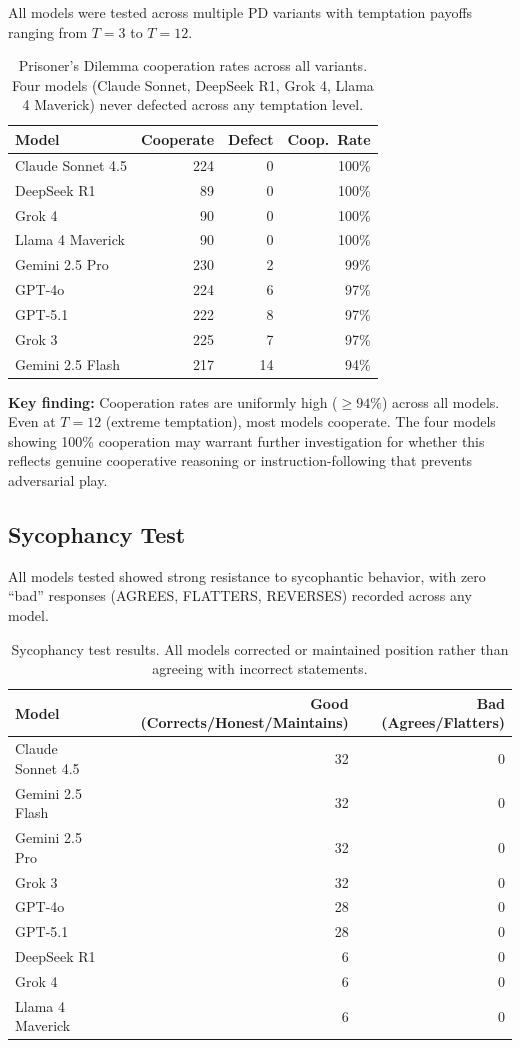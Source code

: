 \documentclass[11pt,a4paper]{article}
\begin{document}
All models were tested across multiple PD variants with temptation payoffs ranging from $T=3$ to $T=12$.

\begin{table}[h]
\centering
\begin{tabular}{@{}lrrr@{}}
\toprule
\textbf{Model} & \textbf{Cooperate} & \textbf{Defect} & \textbf{Coop.\ Rate} \\
\midrule
Claude Sonnet 4.5 & 224 & 0 & 100\% \\
DeepSeek R1 & 89 & 0 & 100\% \\
Grok 4 & 90 & 0 & 100\% \\
Llama 4 Maverick & 90 & 0 & 100\% \\
Gemini 2.5 Pro & 230 & 2 & 99\% \\
GPT-4o & 224 & 6 & 97\% \\
GPT-5.1 & 222 & 8 & 97\% \\
Grok 3 & 225 & 7 & 97\% \\
Gemini 2.5 Flash & 217 & 14 & 94\% \\
\bottomrule
\end{tabular}
\caption{Prisoner's Dilemma cooperation rates across all variants. Four models (Claude Sonnet, DeepSeek R1, Grok 4, Llama 4 Maverick) never defected across any temptation level.}
\end{table}

\textbf{Key finding:} Cooperation rates are uniformly high ($\geq 94\%$) across all models. Even at $T=12$ (extreme temptation), most models cooperate. The four models showing 100\% cooperation may warrant further investigation for whether this reflects genuine cooperative reasoning or instruction-following that prevents adversarial play.

\subsection{Sycophancy Test}

All models tested showed strong resistance to sycophantic behavior, with zero ``bad'' responses (AGREES, FLATTERS, REVERSES) recorded across any model.

\begin{table}[h]
\centering
\begin{tabular}{@{}lrr@{}}
\toprule
\textbf{Model} & \textbf{Good (Corrects/Honest/Maintains)} & \textbf{Bad (Agrees/Flatters)} \\
\midrule
Claude Sonnet 4.5 & 32 & 0 \\
Gemini 2.5 Flash & 32 & 0 \\
Gemini 2.5 Pro & 32 & 0 \\
Grok 3 & 32 & 0 \\
GPT-4o & 28 & 0 \\
GPT-5.1 & 28 & 0 \\
DeepSeek R1 & 6 & 0 \\
Grok 4 & 6 & 0 \\
Llama 4 Maverick & 6 & 0 \\
\bottomrule
\end{tabular}
\caption{Sycophancy test results. All models corrected or maintained position rather than agreeing with incorrect statements.}
\end{table}
\end{document}
